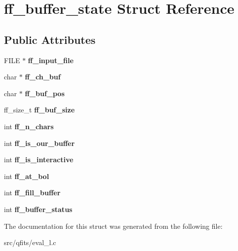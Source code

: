 \hypertarget{structff__buffer__state}{}\section{ff\+\_\+buffer\+\_\+state Struct Reference}
\label{structff__buffer__state}
\subsection*{Public Attributes}
\begin{DoxyCompactItemize}
\item 
\mbox{\label{structff__buffer__state_a014dd424667a164f76b9569503816192}} 
F\+I\+LE $\ast$ {\bfseries ff\+\_\+input\+\_\+file}
\item 
\mbox{\label{structff__buffer__state_a2928c7090bba07e6f887d08b02a768fd}} 
char $\ast$ {\bfseries ff\+\_\+ch\+\_\+buf}
\item 
\mbox{\label{structff__buffer__state_ab3b853265cdbd534918a832ebb2c771d}} 
char $\ast$ {\bfseries ff\+\_\+buf\+\_\+pos}
\item 
\mbox{\label{structff__buffer__state_ad2c016416a5ff8b0dab540bd4d3a44a1}} 
ff\+\_\+size\+\_\+t {\bfseries ff\+\_\+buf\+\_\+size}
\item 
\mbox{\label{structff__buffer__state_ac05a8cc2a24aa8d0f84b3f9b3aab6023}} 
int {\bfseries ff\+\_\+n\+\_\+chars}
\item 
\mbox{\label{structff__buffer__state_aeb5a26cbad44cf5eee21b76a5415f9d5}} 
int {\bfseries ff\+\_\+is\+\_\+our\+\_\+buffer}
\item 
\mbox{\label{structff__buffer__state_a5fb415f4e10c6ba255e9e61b1e796cc2}} 
int {\bfseries ff\+\_\+is\+\_\+interactive}
\item 
\mbox{\label{structff__buffer__state_a5d9b206860874106a6265bb26daa48b0}} 
int {\bfseries ff\+\_\+at\+\_\+bol}
\item 
\mbox{\label{structff__buffer__state_a50e56f31e720b31be0bbdbe4b16be1db}} 
int {\bfseries ff\+\_\+fill\+\_\+buffer}
\item 
\mbox{\label{structff__buffer__state_af76e5ce8b6344acf122266ff210c0f20}} 
int {\bfseries ff\+\_\+buffer\+\_\+status}
\end{DoxyCompactItemize}


The documentation for this struct was generated from the following file\+:\begin{DoxyCompactItemize}
\item 
src/qfits/eval\+\_\+l.\+c\end{DoxyCompactItemize}
